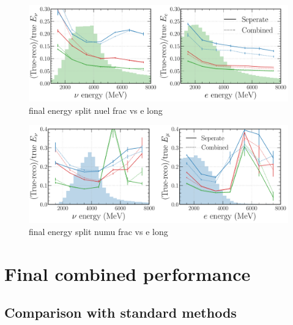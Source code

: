 \begin{figure} %
    \includegraphics[width=\textwidth]{diagrams/6-cvn/chipsnet/final_energy_split_nuel_frac_vs_e.pdf}
    \caption[final energy split nuel frac vs e short]
    {final energy split nuel frac vs e long}
    \label{fig:final_energy_split_nuel_frac_vs_e}
\end{figure}

\begin{figure} %
    \includegraphics[width=\textwidth]{diagrams/6-cvn/chipsnet/final_energy_split_numu_frac_vs_e.pdf}
    \caption[final energy split numu frac vs e short]
    {final energy split numu frac vs e long}
    \label{fig:final_energy_split_numu_frac_vs_e}
\end{figure}

\section{Final combined performance} %
\label{sec:cvn_final} %

\subsection{Comparison with standard methods} %
\label{sec:cvn_final_comparison} %

